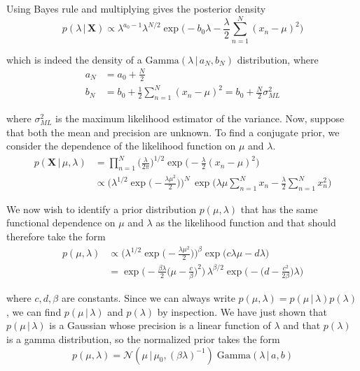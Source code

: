   Using Bayes rule and multiplying gives the posterior density
  \begin{equation}
    p(\lambda\,|\,\mathbf{X}) \propto \lambda^{a_0 - 1} \lambda^{N/2} \exp\bigg( -b_0 \lambda - \frac{\lambda}{2} \sum_{n=1}^N (x_n - \mu)^2 \bigg)
  \end{equation}

  which is indeed the density of a $\text{Gamma}(\lambda\,|\,a_N, b_N)$ distribution, where
  \begin{align*}
    a_N & = a_0 + \frac{N}{2} \\
    b_N & = b_0 + \frac{1}{2} \sum_{n=1}^N (x_n - \mu)^2 = b_0 + \frac{N}{2} \sigma_{ML}^2
  \end{align*}

  where $\sigma_{ML}^2$ is the maximum likelihood estimator of the variance. Now, suppose that both the mean and precision are unknown. To find a conjugate prior, we consider the dependence of the likelihood function on $\mu$ and $\lambda$.
  \begin{align*}
    p(\mathbf{X}\,|\,\mu, \lambda) & = \prod_{n=1}^N \bigg(\frac{\lambda}{2\pi}\bigg)^{1/2} \exp \bigg( -\frac{\lambda}{2} (x_n - \mu)^2 \bigg) \\
    & \propto \bigg(\lambda^{1/2} \exp \Big(-\frac{\lambda \mu^2}{2} \Big) \bigg)^N \, \exp \bigg( \lambda \mu \sum_{n=1}^N x_n - \frac{\lambda}{2} \sum_{n=1}^N x_n^2 \bigg)
  \end{align*}

  We now wish to identify a prior distribution $p(\mu, \lambda)$ that has the same functional dependence on $\mu$ and $\lambda$ as the likelihood function and that should therefore take the form
  \begin{align*}
    p(\mu, \lambda) & \propto \bigg( \lambda^{1/2} \exp \Big(-\frac{\lambda \mu^2}{2}\Big) \bigg)^\beta \exp\big( c \lambda \mu - d \lambda \big) \\
    & = \exp \bigg( -\frac{\beta \lambda}{2} \Big(\mu - \frac{c}{\beta} \Big)^2 \bigg) \, \lambda^{\beta/2} \exp \bigg(-\Big(d - \frac{c^2}{2\beta}\Big) \lambda \bigg)
  \end{align*}

  where $c, d, \beta$ are constants. Since we can always write $p(\mu, \lambda) = p(\mu\,|\,\lambda) p(\lambda)$, we can find $p(\mu\,|\,\lambda)$ and $p(\lambda)$ by inspection. We have just shown that $p(\mu \,|\, \lambda)$ is a Gaussian whose precision is a linear function of $\lambda$ and that $p(\lambda)$ is a gamma distribution, so the normalized prior takes the form
  \begin{equation}
    p(\mu, \lambda) = \mathcal{N}(\mu \,|\, \mu_0, (\beta\lambda)^{-1}) \; \text{Gamma}(\lambda\,|\,a, b)
  \end{equation}

